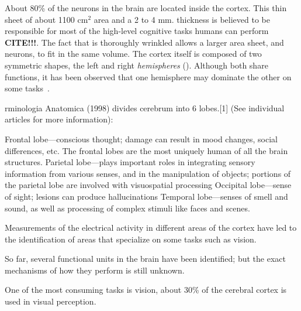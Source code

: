 About 80\% of the neurons in the brain are located inside the cortex. This thin sheet of about 1100 cm$^2$ area and a 2 to 4 mm. thickness is believed to be responsible for most of the high-level cognitive tasks humans can perform \textbf{CITE!!!}. The fact that is thoroughly wrinkled allows a larger area sheet, and neurons, to fit in the same volume. 
The cortex itself is composed of two symmetric shapes, the left and right \emph{hemispheres} (). Although both share functions, it has been observed that one hemisphere may dominate the other on some tasks~\cite{lateralization}. 

rminologia Anatomica (1998) divides cerebrum into 6 lobes.[1] (See individual articles for more information):

Frontal lobe—conscious thought; damage can result in mood changes, social differences, etc. The frontal lobes are the most uniquely human of all the brain structures.
Parietal lobe—plays important roles in integrating sensory information from various senses, and in the manipulation of objects; portions of the parietal lobe are involved with visuospatial processing
Occipital lobe—sense of sight; lesions can produce hallucinations
Temporal lobe—senses of smell and sound, as well as processing of complex stimuli like faces and scenes.

Measurements of the electrical activity in different areas of the cortex have led to the identification of areas that specialize on some tasks such as vision. 

So far, several functional units in the brain have been identified; but the exact mechanisms of how they perform is still unknown.


One of the most consuming tasks is vision, about 30\% of the cerebral cortex is used in visual perception. 

